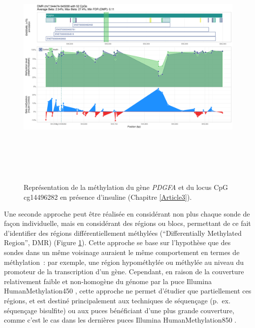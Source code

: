 \documentclass[11pt,a4paper,notrimn]{krantz}
\theoremstyle{definition}
\theoremstyle{definition}
\theoremstyle{remark}
\begin{document}
\begin{figure}[!htb]

{\centering \includegraphics[width=6in,height=4.8in]{FiguresTables/DMR} 

}

\caption{Représentation de la méthylation du gène \emph{PDGFA} et du
locus CpG cg14496282 en présence d'insuline (Chapitre \ref{Article3}).}\label{fig:DMR}
\end{figure}

Une seconde approche peut être réalisée en considérant non plus chaque
sonde de façon individuelle, mais en considérant des régions ou blocs,
permettant de ce fait d'identifier des régions différentiellement
méthylées (``Differentially Methylated Region'', DMR)
\citep{peters_novo_2015, hansen_increased_2011, hansen_bsmooth:_2012}
(Figure \ref{fig:DMR}). Cette approche se base sur l'hypothèse que des
sondes dans un même voisinage auraient le même comportement en termes de
méthylation~: par exemple, une région hypométhylée ou méthylée au niveau
du promoteur de la transcription d'un gène. Cependant, en raison de la
couverture relativement faible et non-homogène du génome par la puce
Illumina HumanMethylation450 \citep{bibikova_high_2011}, cette approche
ne permet d'étudier que partiellement ces régions, et est destiné
principalement aux techniques de séquençage (p.~ex. séquençage
bisulfite) ou aux puces bénéficiant d'une plus grande couverture, comme
c'est le cas dans les dernières puces Illumina HumanMethylation850
\citep{moran_validation_2016}.
\end{document}
